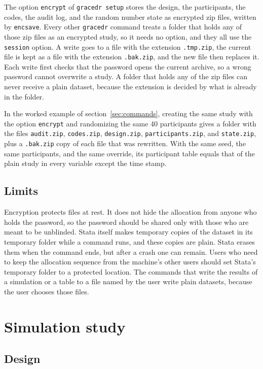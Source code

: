 \documentclass[bib]{statapress}
\begin{document}
The option \texttt{encrypt} of \texttt{gracedr setup} stores the design, the
participants, the codes, the audit log, and the random number state as encrypted
zip files, written by \texttt{encsave}. Every other \texttt{gracedr} command
treats a folder that holds any of those zip files as an encrypted study, so it
needs no option, and they all use the \texttt{session} option. A write goes to a
file with the extension \texttt{.tmp.zip}, the current file is kept as a file
with the extension \texttt{.bak.zip}, and the new file then replaces it. Each
write first checks that the password opens the current archive, so a wrong
password cannot overwrite a study. A folder that holds any of the zip files can
never receive a plain dataset, because the extension is decided by what is
already in the folder.

In the worked example of section~\ref{sec:commands}, creating the same study
with the option \texttt{encrypt} and randomizing the same 40 participants gives
a folder with the files \texttt{audit.zip}, \texttt{codes.zip},
\texttt{design.zip}, \texttt{participants.zip}, and \texttt{state.zip}, plus a
\texttt{.bak.zip} copy of each file 
that was rewritten. With the same seed, the
same participants, and the same override, its participant table equals that of
the plain study in every variable except the time stamp.

\subsection{Limits}

Encryption protects files at rest. It does not hide the allocation from anyone
who holds the password, so the password should be shared only with those who are
meant to be unblinded. Stata itself makes temporary copies of the dataset in its
temporary folder while a command runs, and these copies are plain. Stata erases
them when the command ends, but after a crash one can remain. Users who need to
keep the allocation sequence from the machine's other 
users should set Stata's
temporary folder to a protected location. The commands that write the results of
a simulation or a table to a file named by the user write plain datasets,
because the user chooses those files.

\section{Simulation study}
\label{sec:sim}

\subsection{Design}
\end{document}
